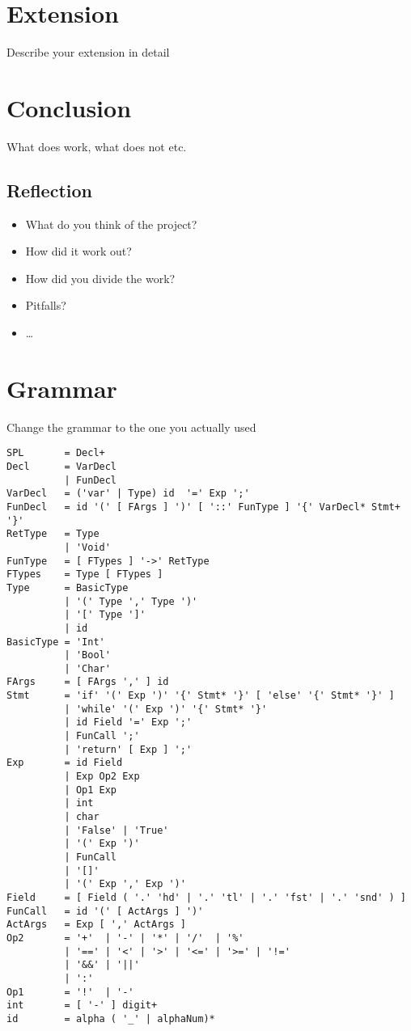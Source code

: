 \documentclass{report}
\begin{document}
\chapter{Extension}
Describe your extension in detail

\chapter{Conclusion}
What does work, what does not etc.

\section{Reflection}
\begin{itemize}
	\item What do you think of the project?
	\item How did it work out?
	\item How did you divide the work?
	\item Pitfalls?
	\item \ldots
\end{itemize}

\appendix
\chapter{Grammar}
Change the grammar to the one you actually used

\begin{verbatim}
SPL       = Decl+
Decl      = VarDecl
          | FunDecl
VarDecl   = ('var' | Type) id  '=' Exp ';'
FunDecl   = id '(' [ FArgs ] ')' [ '::' FunType ] '{' VarDecl* Stmt+ '}'
RetType   = Type
          | 'Void'
FunType   = [ FTypes ] '->' RetType
FTypes    = Type [ FTypes ]
Type      = BasicType
          | '(' Type ',' Type ')'
          | '[' Type ']'
          | id
BasicType = 'Int'
          | 'Bool'
          | 'Char'
FArgs     = [ FArgs ',' ] id
Stmt      = 'if' '(' Exp ')' '{' Stmt* '}' [ 'else' '{' Stmt* '}' ]
          | 'while' '(' Exp ')' '{' Stmt* '}'
          | id Field '=' Exp ';'
          | FunCall ';'
          | 'return' [ Exp ] ';'
Exp       = id Field
          | Exp Op2 Exp
          | Op1 Exp
          | int
          | char
          | 'False' | 'True'
          | '(' Exp ')'
          | FunCall
          | '[]'
          | '(' Exp ',' Exp ')'
Field     = [ Field ( '.' 'hd' | '.' 'tl' | '.' 'fst' | '.' 'snd' ) ]
FunCall   = id '(' [ ActArgs ] ')'
ActArgs   = Exp [ ',' ActArgs ]
Op2       = '+'  | '-' | '*' | '/'  | '%'
          | '==' | '<' | '>' | '<=' | '>=' | '!='
          | '&&' | '||'
          | ':'
Op1       = '!'  | '-'
int       = [ '-' ] digit+
id        = alpha ( '_' | alphaNum)*
\end{verbatim}
\end{document}
